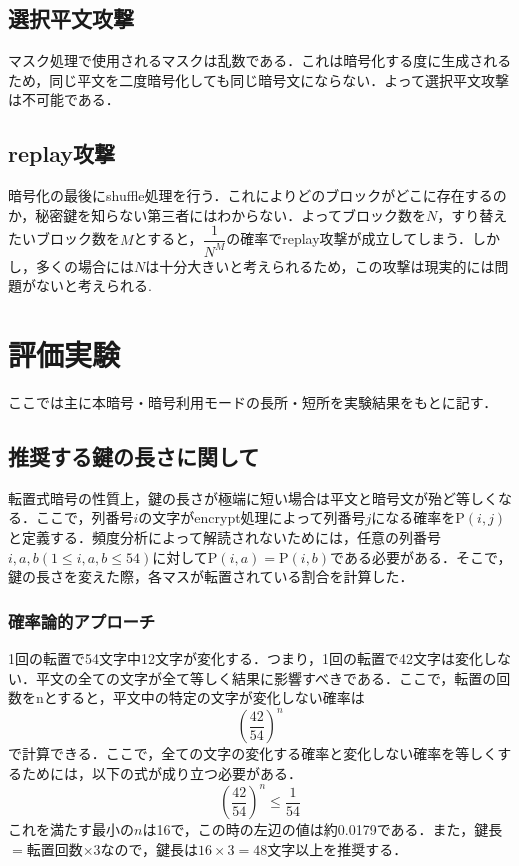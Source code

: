 \documentclass[titlepage]{jarticle}
\begin{document}
\subsection{選択平文攻撃}
マスク処理で使用されるマスクは乱数である．これは暗号化する度に生成されるため，同じ平文を二度暗号化しても同じ暗号文にならない．よって選択平文攻撃は不可能である．

\subsection{replay攻撃}
暗号化の最後にshuffle処理を行う．これによりどのブロックがどこに存在するのか，秘密鍵を知らない第三者にはわからない．よってブロック数を\(N\)，すり替えたいブロック数を\(M\)とすると，\(\dfrac{1}{N^M}\)の確率でreplay攻撃が成立してしまう．しかし，多くの場合には\(N\)は十分大きいと考えられるため，この攻撃は現実的には問題がないと考えられる.

\section{評価実験}
ここでは主に本暗号・暗号利用モードの長所・短所を実験結果をもとに記す．
\subsection{推奨する鍵の長さに関して}
転置式暗号の性質上，鍵の長さが極端に短い場合は平文と暗号文が殆ど等しくなる．ここで，列番号\(i\)の文字がencrypt処理によって列番号\(j\)になる確率を\(\mathrm{P}(i,j)\)と定義する．頻度分析によって解読されないためには，任意の列番号\(i,a,b(1\leq i,a,b\leq 54)\)に対して\(\mathrm{P}(i,a)=\mathrm{P}(i,b)\)である必要がある．そこで，鍵の長さを変えた際，各マスが転置されている割合を計算した．

\subsubsection{確率論的アプローチ}
1回の転置で54文字中12文字が変化する．つまり，1回の転置で42文字は変化しない．平文の全ての文字が全て等しく結果に影響すべきである．ここで，転置の回数をnとすると，平文中の特定の文字が変化しない確率は
\[\left(\frac{42}{54}\right)^n\]
で計算できる．ここで，全ての文字の変化する確率と変化しない確率を等しくするためには，以下の式が成り立つ必要がある．
\[\left(\frac{42}{54}\right)^n \leq \frac{1}{54}\]
これを満たす最小の\(n\)は16で，この時の左辺の値は約0.0179である．また，鍵長\(=\)転置回数\(\times 3\)なので，鍵長は\(16\times3=48\)文字以上を推奨する．
\end{document}
